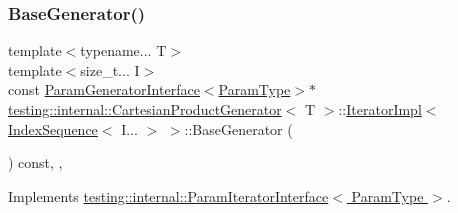 \subsubsection{\texorpdfstring{Base\+Generator()}{BaseGenerator()}}
{\footnotesize\ttfamily template$<$typename... T$>$ \\
template$<$size\+\_\+t... I$>$ \\
const \hyperlink{classtesting_1_1internal_1_1ParamGeneratorInterface}{Param\+Generator\+Interface}$<$\hyperlink{classtesting_1_1internal_1_1CartesianProductGenerator_af27131157a9347f0c82420ca081ee7dd}{Param\+Type}$>$$\ast$ \hyperlink{classtesting_1_1internal_1_1CartesianProductGenerator}{testing\+::internal\+::\+Cartesian\+Product\+Generator}$<$ T $>$\+::\hyperlink{classtesting_1_1internal_1_1CartesianProductGenerator_1_1IteratorImpl}{Iterator\+Impl}$<$ \hyperlink{structtesting_1_1internal_1_1IndexSequence}{Index\+Sequence}$<$ I... $>$ $>$\+::Base\+Generator (\begin{DoxyParamCaption}{ }\end{DoxyParamCaption}) const\hspace{0.3cm}{\ttfamily [inline]}, {\ttfamily [override]}, {\ttfamily [virtual]}}



Implements \hyperlink{classtesting_1_1internal_1_1ParamIteratorInterface_a17500953df75ecda1ace46c08ff731e9}{testing\+::internal\+::\+Param\+Iterator\+Interface$<$ Param\+Type $>$}.

\mbox{\label{classtesting_1_1internal_1_1CartesianProductGenerator_1_1IteratorImpl_3_01IndexSequence_3_01I_8_8_8_01_4_01_4_a0b434e09b32dfd6b444085cf95dc22ab}} 
